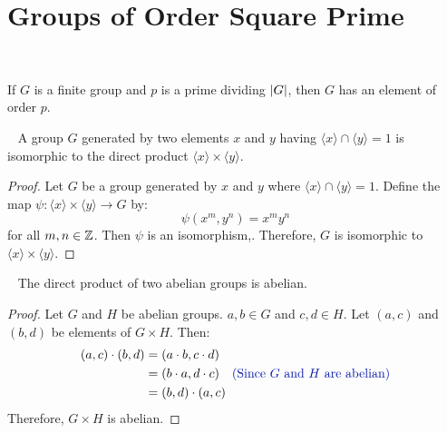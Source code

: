 \section{Groups of Order Square Prime}~\label{sec:prime-square}

\begin{theorem}\label{thm:cauchy}
  If $G$ is a finite group and $p$ is a prime dividing $\lvert G\rvert$,
  then $G$ has an element of order $p$.~\cite[p.~93,~Theorem~3.1]{DummitFoote} 
\end{theorem}

\begin{proposition}~\label{prop:trivial-isom-direct-product}
  A group $G$ generated by two elements $x$ and $y$
  having $\langle x \rangle \cap \langle y \rangle = 1$
  is isomorphic to the direct product $\langle x \rangle \times \langle y \rangle$.

  \begin{proof}
    Let $G$ be a group generated by $x$ and $y$
    where $\langle x \rangle \cap \langle y \rangle = 1$.
    Define the map $\psi: \langle x \rangle \times \langle y \rangle \to G$ by:
    \[ \psi(x^m, y^n) = x^my^n \]
    for all $m, n \in \mathbb{Z}$.
    Then $\psi$ is an isomorphism,.
    Therefore, $G$ is isomorphic to $\langle x \rangle \times \langle y \rangle$.
  \end{proof}
\end{proposition}

\begin{proposition}~\label{prop:abelian-dir-prod-abelian}
  The direct product of two abelian groups is abelian.

  \begin{proof}
    Let $G$ and $H$ be abelian groups.
    $a, b \in G$ and $c, d \in H$.
    Let $(a, c)$ and $(b, d)$ be elements of $G \times H$.
    Then:
    \begin{align*}
      (a, c) \cdot (b, d) &= (a \cdot b, c \cdot d) \\
                          &= (b \cdot a, d \cdot c) \quad \zaff{\text{(Since $G$ and $H$ are abelian)}} \\
                          &= (b, d) \cdot (a, c)
    \end{align*}
    Therefore, $G \times H$ is abelian.
  \end{proof}
\end{proposition}

